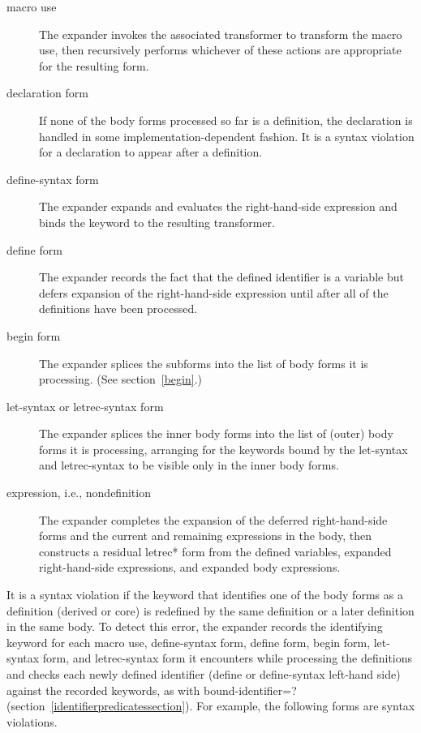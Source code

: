 \begin{description}
\item[macro use]
The expander invokes the associated transformer to transform the macro
use, then recursively performs whichever of these actions are appropriate
for the resulting form.

\item[{\cf declaration} form]
If none of the body forms processed so far is a definition, the
declaration is handled in some implementation-dependent fashion.
It is a syntax violation for a declaration to appear after a definition.

\item[{\cf define-syntax} form]
The expander expands and evaluates the right-hand-side expression and binds the
keyword to the resulting transformer.

\item[{\cf define} form]
The expander records the fact that the defined identifier is a variable but defers
expansion of the right-hand-side expression until after all of the
definitions have been processed.

\item[{\cf begin} form]
The expander splices the subforms into the list of body forms it is
processing.  (See section~\ref{begin}.)

\item[{\cf let-syntax} or {\cf letrec-syntax} form]
The expander splices the inner body forms into the list of (outer) body forms it is
processing, arranging for the keywords bound by the {\cf let-syntax}
and {\cf letrec-syntax} to be visible only in the inner body forms.

\item[expression, i.e., nondefinition]
The expander completes the expansion of the deferred right-hand-side forms
and the current and remaining expressions in the body, then
constructs a residual {\cf letrec*} form from the defined variables,
expanded right-hand-side expressions, and expanded body expressions.
\end{description}

It is a syntax violation
if the keyword that identifies one of the body forms
as a definition (derived or core) is redefined by the same definition or a
later definition in the same body.
To detect this error, the expander records the identifying keyword for each
macro use, {\cf define-syntax} form, {\cf define}
form, {\cf begin} form, {\cf let-syntax} form, and {\cf letrec-syntax}
form it encounters while processing the definitions and checks each
newly defined identifier ({\cf define} or {\cf define-syntax}
left-hand side) against the recorded keywords, as with
{\cf bound-identifier=?} (section~\ref{identifierpredicatessection}).
For example, the following forms are syntax violations.

